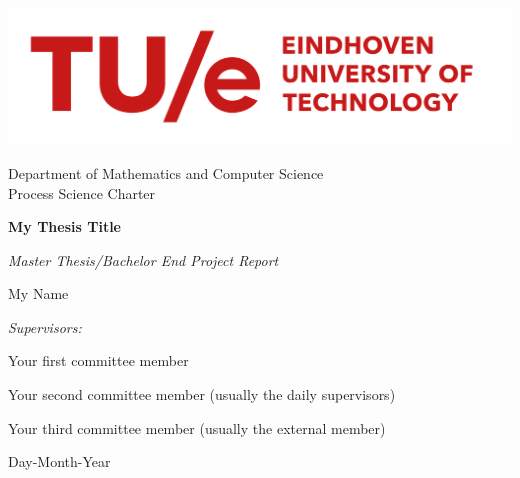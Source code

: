 \documentclass[12pt,a4paper,footinclude=true,twoside,headinclude=true]{report}
\begin{document}
\begin{titlepage}
\centering
\includegraphics[width=0.7\linewidth]{TUe-logo-descriptor-line-scarlet-L.png}\par
Department of Mathematics and Computer Science\\
Process Science Charter

\vspace{3cm}
{\LARGE\textbf{My Thesis Title}}\par\vspace{0.5cm}
{\large\textit{Master Thesis/Bachelor End Project Report}}\par\vspace{1cm}
{\large My Name}\par

\vfill

\emph{Supervisors:}\par
Your first committee member\par
Your second committee member (usually the daily supervisors)\par
Your third committee member (usually the external member)\par

\vspace{2cm}

{Day-Month-Year}

\end{titlepage}
\end{document}
